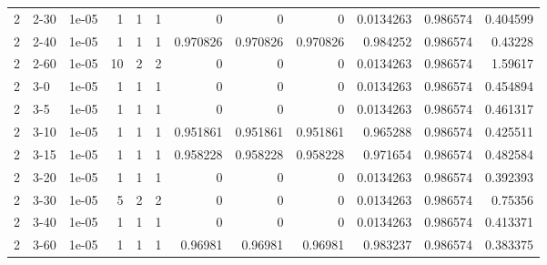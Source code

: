 \begin{tabular}{rlrrrrrrrrrr}
     2 & 2-30   &      1e-05 &           1 &                 1 &                 1 &     0           &     0           &      0           &        0.0134263 &               0.986574 &           0.404599 \\
     2 & 2-40   &      1e-05 &           1 &                 1 &                 1 &     0.970826    &     0.970826    &      0.970826    &        0.984252  &               0.986574 &           0.43228  \\
     2 & 2-60   &      1e-05 &          10 &                 2 &                 2 &     0           &     0           &      0           &        0.0134263 &               0.986574 &           1.59617  \\
     2 & 3-0    &      1e-05 &           1 &                 1 &                 1 &     0           &     0           &      0           &        0.0134263 &               0.986574 &           0.454894 \\
     2 & 3-5    &      1e-05 &           1 &                 1 &                 1 &     0           &     0           &      0           &        0.0134263 &               0.986574 &           0.461317 \\
     2 & 3-10   &      1e-05 &           1 &                 1 &                 1 &     0.951861    &     0.951861    &      0.951861    &        0.965288  &               0.986574 &           0.425511 \\
     2 & 3-15   &      1e-05 &           1 &                 1 &                 1 &     0.958228    &     0.958228    &      0.958228    &        0.971654  &               0.986574 &           0.482584 \\
     2 & 3-20   &      1e-05 &           1 &                 1 &                 1 &     0           &     0           &      0           &        0.0134263 &               0.986574 &           0.392393 \\
     2 & 3-30   &      1e-05 &           5 &                 2 &                 2 &     0           &     0           &      0           &        0.0134263 &               0.986574 &           0.75356  \\
     2 & 3-40   &      1e-05 &           1 &                 1 &                 1 &     0           &     0           &      0           &        0.0134263 &               0.986574 &           0.413371 \\
     2 & 3-60   &      1e-05 &           1 &                 1 &                 1 &     0.96981     &     0.96981     &      0.96981     &        0.983237  &               0.986574 &           0.383375 \\

\end{tabular}
